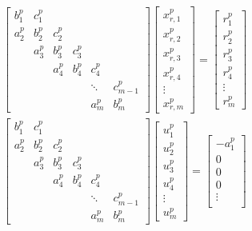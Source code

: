 \documentclass{elsarticle}
\begin{document}
\begin{align}
& \begin{bmatrix}
b_1^p & c_1^p \\
a_2^p & b_2^p & c_2^p \\
      & a_3^p & b_3^p & c_3^p \\
      &       & a_4^p & b_4^p & c_4^p \\
      &       &       &       &  \ddots & c_{m-1}^p\\
      &       &       &       &     a_{m}^p  & b_{m}^p
\end{bmatrix}
\begin{bmatrix}
x_{r,1}^p \\
x_{r,2}^p \\
x_{r,3}^p \\
x_{r,4}^p \\
\vdots \\
x_{r,m}^p
\end{bmatrix}
=
\begin{bmatrix}
r_1^p \\
r_2^p \\
r_3^p \\
r_4^p \\
\vdots \\
r_m^p
\end{bmatrix} & \label{eqn:primary-system} \\
%
%
%
& \begin{bmatrix}
b_1^p & c_1^p \\
a_2^p & b_2^p & c_2^p \\
      & a_3^p & b_3^p & c_3^p \\
      &       & a_4^p & b_4^p & c_4^p \\
      &       &       &       &  \ddots & c_{m-1}^p\\
      &       &       &       &     a_{m}^p  & b_{m}^p
\end{bmatrix}
\begin{bmatrix}
u_1^p \\
u_2^p \\
u_3^p \\
u_4^p \\
\vdots \\
u_m^p
\end{bmatrix}
=
\begin{bmatrix}
-a_1^p \\
0 \\
0 \\
0 \\
\vdots \\

\end{bmatrix}
\end{align}
\end{document}
